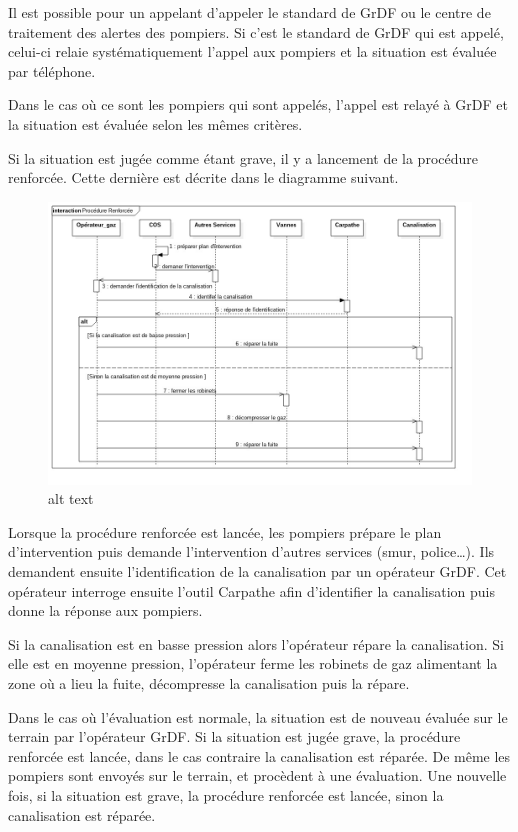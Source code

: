 \documentclass[
12pt,
french,                           %
a4paper,
]{article}
\begin{document}
Il est possible pour un appelant d'appeler le standard de GrDF ou le
centre de traitement des alertes des pompiers. Si c'est le standard de
GrDF qui est appelé, celui-ci relaie systématiquement l'appel aux
pompiers et la situation est évaluée par téléphone.

Dans le cas où ce sont les pompiers qui sont appelés, l'appel est relayé
à GrDF et la situation est évaluée selon les mêmes critères.

Si la situation est jugée comme étant grave, il y a lancement de la
procédure renforcée. Cette dernière est décrite dans le diagramme
suivant.

\begin{figure}[htbp]
\centering
\includegraphics{Ds_ProcedureRenforcee.jpg}
\caption{alt text}
\end{figure}

Lorsque la procédure renforcée est lancée, les pompiers prépare le plan
d'intervention puis demande l'intervention d'autres services (smur,
police\ldots{}). Ils demandent ensuite l'identification de la
canalisation par un opérateur GrDF. Cet opérateur interroge ensuite
l'outil Carpathe afin d'identifier la canalisation puis donne la réponse
aux pompiers.

Si la canalisation est en basse pression alors l'opérateur répare la
canalisation. Si elle est en moyenne pression, l'opérateur ferme les
robinets de gaz alimentant la zone où a lieu la fuite, décompresse la
canalisation puis la répare.

Dans le cas où l'évaluation est normale, la situation est de nouveau
évaluée sur le terrain par l'opérateur GrDF. Si la situation est jugée
grave, la procédure renforcée est lancée, dans le cas contraire la
canalisation est réparée. De même les pompiers sont envoyés sur le
terrain, et procèdent à une évaluation. Une nouvelle fois, si la
situation est grave, la procédure renforcée est lancée, sinon la
canalisation est réparée.
\end{document}
